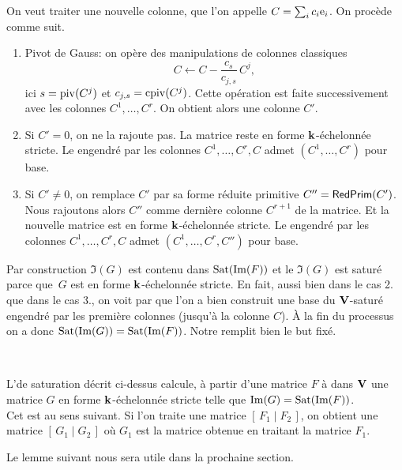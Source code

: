 On veut traiter une nouvelle colonne, que l'on appelle $C=\sum_i c_i\mathrm{e}_i$.
On procède comme suit.
%
\begin{enumerate}
%
\item Pivot de Gauss:  on opère des manipulations \elrs
de colonnes classiques 
  $$
  C\leftarrow C- \frac{c_s}{c_{j,s}}\,C^j,
  $$ 
ici $s=\mathrm{piv}(C^j)$
et $c_{j,s}=\mathrm{cpiv}(C^j)$.
Cette opération est faite successivement avec les colonnes $C^1,\dots,C^r$.
On obtient alors une colonne $C'$. 
%
\item Si $C'=0$, on ne la rajoute pas. 
La matrice reste  en forme $\mathbf{k}$-échelonnée stricte.
Le \Kev engendré par les colonnes $C^1,\dots,C^r,C$ admet $(C^1,\dots,C^r)$ pour base.
%
\item Si $C'\neq 0$, on remplace $C'$ par sa forme réduite primitive
$C''=\mathsf{RedPrim}(C')$. Nous rajoutons
alors $C''$ comme dernière colonne $C^{r+1}$ de la matrice.
Et la nouvelle matrice est  en forme $\mathbf{k}$-échelonnée stricte.
Le \Kev engendré par les colonnes $C^1,\dots,C^r,C$ admet 
$(C^1,\dots,C^r,C'')$ pour base.   
%
\end{enumerate}

Par construction $\Im(G)$ est contenu dans $\mathrm{Sat}(\mathrm{Im}(F))$ et le \Vmo $\Im(G)$ est saturé parce que~$G$ est en  forme $\mathbf{k}$-échelonnée stricte.
En fait, aussi bien dans le cas 2. que dans le cas 3., on voit par \recu que l'on a bien construit une base du $\mathbf{V}$-saturé engendré par les première colonnes (jusqu'à la colonne $C$). \`A la fin du processus on a donc $\mathrm{Sat}(\mathrm{Im}(G))=\mathrm{Sat}(\mathrm{Im}(F))$.  
Notre \algo remplit bien le but fixé.

\begin{ftheorem} \label{fthAlgoSat}~

\noindent L'\algo de saturation décrit ci-dessus calcule, à partir
d'une matrice $F$ à \coes dans $\mathbf{V}$ une matrice $G$  en  forme $\mathbf{k}$-échelonnée stricte telle que $\mathrm{Im}(G)=\mathrm{Sat}(\mathrm{Im}(F))$.
\\
Cet \algo est  au sens suivant. Si l'on traite une matrice
$[\,F_1\mid F_2\,]$, on obtient une matrice $[\,G_1\mid G_2\,]$ où $G_1$
est la matrice obtenue en traitant la matrice $F_1$.
\end{ftheorem}



\medskip 
Le lemme suivant nous sera utile dans la prochaine section.

